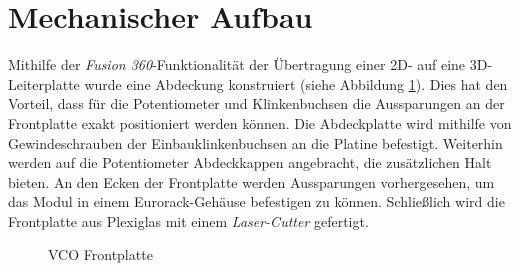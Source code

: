 \newpage
\section{Mechanischer Aufbau}
Mithilfe der \textit{Fusion 360}-Funktionalität der Übertragung einer 2D- auf eine 3D-Leiterplatte wurde eine Abdeckung konstruiert (siehe Abbildung \ref{fig:VCO Frontplattemit 3D-Leiterplatte}).
Dies hat den Vorteil, dass für die Potentiometer und Klinkenbuchsen die Aussparungen an der Frontplatte exakt positioniert werden können.
Die Abdeckplatte wird mithilfe von Gewindeschrauben der Einbauklinkenbuchsen an die Platine befestigt.
Weiterhin werden auf die Potentiometer Abdeckkappen angebracht, die zusätzlichen Halt bieten.
An den Ecken der Frontplatte werden Aussparungen vorhergesehen, um das Modul in einem Eurorack-Gehäuse befestigen zu können.
Schließlich wird die Frontplatte aus Plexiglas mit einem \textit{Laser-Cutter} gefertigt.

\begin{figure}[h]
	\centering
	\setlength{\fboxsep}{1pt} %
	\setlength{\fboxrule}{1pt} %
	\caption{VCO Frontplatte}
	\label{fig:VCO Frontplattemit 3D-Leiterplatte}
\end{figure}